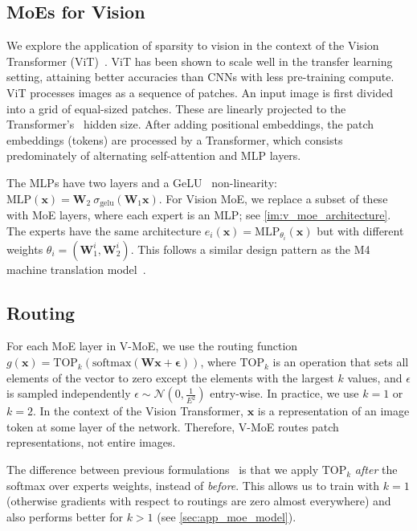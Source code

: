 \documentclass{article}
\newcommand{\name}{Vision MoE}
\newcommand{\abbv}{{V-MoE}}
\begin{document}
\subsection{MoEs for Vision}
We explore the application of sparsity to vision in the context of the Vision Transformer (ViT)~\cite{dosovitskiy2020image}.
ViT has been shown to scale well in the transfer learning setting, attaining better accuracies than CNNs with less pre-training compute.
ViT processes images as a sequence of patches.
An input image is first divided into a grid of equal-sized patches.
These are linearly projected to the Transformer's~\cite{vaswani2017attention} hidden size.
After adding positional embeddings, the patch embeddings (tokens) are processed by a Transformer, which consists predominately of alternating self-attention and MLP layers.

The MLPs have two layers and a GeLU~\cite{hendrycks2016gaussian} non-linearity:
$\mathrm{MLP}(\mathbf{x})= \mathbf{W}_2 \ \sigma_\text{gelu}(\mathbf{W}_1 \mathbf{x})$.
For \name{}, we replace a subset of these with MoE layers, where each expert is an MLP; see \cref{im:v_moe_architecture}. The experts have the same architecture $e_i(\mathbf{x})=\mathrm{MLP}_{\theta_i}(\mathbf{x})$ but with different weights 
$\theta_i = (\mathbf{W}_1^i, \mathbf{W}_2^i)$. This follows a similar design pattern as the M4 machine translation model~\cite{lepikhin2020gshard}.


\subsection{Routing}
\label{sec:routing}
For each MoE layer in \abbv{}, we use the routing function $g(\mathbf{x}) = \text{TOP}_k \left ( \text{softmax} \left( \mathbf{W}\mathbf{x} + \mathbf{\epsilon} \right) \right )$, where $\text{TOP}_k$ is an operation that sets all elements of the vector to zero except the elements with the largest $k$ values, and $\epsilon$ is sampled independently $\epsilon \sim \mathcal{N}(0, \frac{1}{E^2})$ entry-wise.
In practice, we use $k=1$ or $k=2$.
In the context of the Vision Transformer, $\mathbf{x}$ is a representation of an image token at some layer of the network.
Therefore, \abbv{} routes patch representations, not entire images.

The difference between previous formulations~\cite{shazeer2017outrageously} is that we apply $\text{TOP}_k$ \textit{after} the softmax over experts weights, instead of \textit{before}.
This allows us to train with $k=1$ (otherwise gradients with respect to routings are zero almost everywhere) and also performs better for $k > 1$ (see \cref{sec:app_moe_model}).
\end{document}
